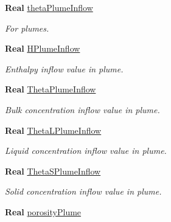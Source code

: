 \begin{DoxyCompactItemize}
\textbf{ Real} \hyperlink{class_mushy_layer_params_abd2acb1163b9a8660abea009ecbc2a09}{theta\+Plume\+Inflow}
\begin{DoxyCompactList}\small\item\em For plumes. \end{DoxyCompactList}\item 
\mbox{\label{class_mushy_layer_params_ae3cbbe4b6c0ac5438a2c753d615e175e}} 
\textbf{ Real} \hyperlink{class_mushy_layer_params_ae3cbbe4b6c0ac5438a2c753d615e175e}{H\+Plume\+Inflow}
\begin{DoxyCompactList}\small\item\em Enthalpy inflow value in plume. \end{DoxyCompactList}\item 
\mbox{\label{class_mushy_layer_params_a20062da3b7047b0f9fc5a3f5d320499c}} 
\textbf{ Real} \hyperlink{class_mushy_layer_params_a20062da3b7047b0f9fc5a3f5d320499c}{Theta\+Plume\+Inflow}
\begin{DoxyCompactList}\small\item\em Bulk concentration inflow value in plume. \end{DoxyCompactList}\item 
\mbox{\label{class_mushy_layer_params_ab0d16dc81fb443313e427b11ff37a83d}} 
\textbf{ Real} \hyperlink{class_mushy_layer_params_ab0d16dc81fb443313e427b11ff37a83d}{Theta\+L\+Plume\+Inflow}
\begin{DoxyCompactList}\small\item\em Liquid concentration inflow value in plume. \end{DoxyCompactList}\item 
\mbox{\label{class_mushy_layer_params_a70175dbbe59391b96e645b6177299f46}} 
\textbf{ Real} \hyperlink{class_mushy_layer_params_a70175dbbe59391b96e645b6177299f46}{Theta\+S\+Plume\+Inflow}
\begin{DoxyCompactList}\small\item\em Solid concentration inflow value in plume. \end{DoxyCompactList}\item 
\mbox{\label{class_mushy_layer_params_af380ecbe4bc2c44acc5f857e715743dc}} 
\textbf{ Real} \hyperlink{class_mushy_layer_params_af380ecbe4bc2c44acc5f857e715743dc}{porosity\+Plume}

\end{DoxyCompactItemize}

